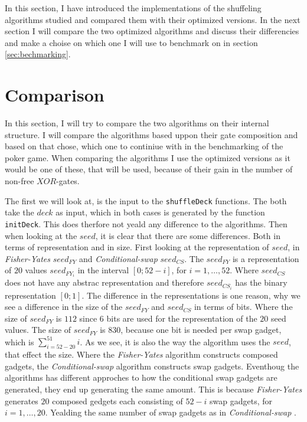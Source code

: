 \documentclass[twoside,11pt,openright]{report}
\newcommand{\FY}{\textit{Fisher-Yates} }
\newcommand{\CS}{\textit{Conditional-swap} }
\begin{document}
\bigskip

In this section, I have introduced the implementations of the shuffeling algorithms studied and compared them with their optimized versions. In the next section I will compare the two optimized algorithms and discuss their differencies and make a choise on which one I will use to benchmark on in section \ref{sec:bechmarking}.

\section{Comparison}
\label{sec:comp}

In this section, I will try to compare the two algorithms on their internal structure. I will compare the algorithms based uppon their gate composition and based on that chose, which one to continiue with in the benchmarking of the poker game. When comparing the algorithms I use the optimized versions as it would be one of these, that will be used, because of their gain in the number of non-free $XOR$-gates.

\bigskip

The first we will look at, is the input to the \verb|shuffleDeck| functions. The both take the $deck$ as input, which in both cases is generated by the function \verb|initDeck|. This does therfore not yeald any difference to the algorithms. Then when looking at the $seed$, it is clear that there are some differences. Both in terms of representation and in size. First looking at the representation of $seed$, in \FY $seed_{FY}$ and \CS $seed_{CS}$. The $seed_{FY}$ is a representation of $20$ values $seed_{FY_i}$ in the interval $[0;52-i]$, for $i=1,\dots, 52$. Where $seed_{CS}$ does not have any abstrac representation and therefore $seed_{CS_i}$ has the binary representation $[0;1]$. The difference in the representations is one reason, why we see a difference in the size of the $seed_{FY}$ and $seed_{CS}$ in terms of bits. Where the size of $seed_{FY}$ is $112$ since $6$ bits are used for the representation of the $20$ seed values. The size of $seed_{FY}$ is $830$, because one bit is needed per swap gadget, which is $\sum_{i=52-20}^{51} i$. As we see, it is also the way the algorithm uses the $seed$, that effect the size. Where the \FY algorithm constructs composed gadgets, the \CS algorithm constructs swap gadgets. Eventhoug the algorithms has different approches to how the conditional swap gadgets are generated, they end up generating the same amount. This is because \FY generates $20$ composed gedgets each consisting of $52-i$ swap gadgets, for $i=1,\dots,20$. Yealding the same number of swap gadgets as in \CS.
\end{document}
